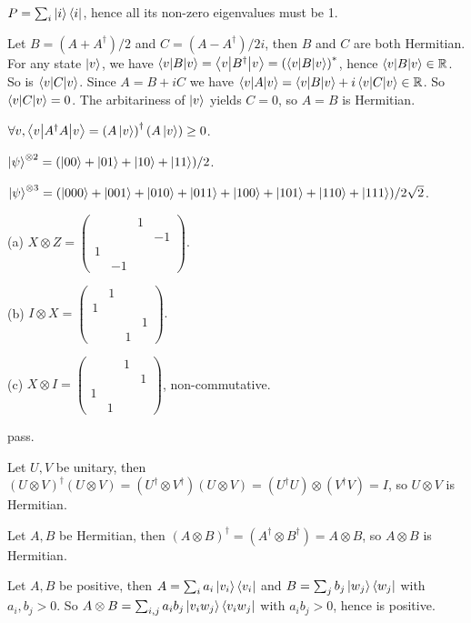 \ex $P=\sum_i\left|i\right\rangle\left\langle i\right|$, hence all its non-zero eigenvalues must be 1.

\ex Let $B=(A+A^\dagger)/2$ and $C=(A-A^\dagger)/2i$, then $B$ and $C$ are both Hermitian.
For any state $\left|v\right\rangle$, we have $\left\langle v\middle|B\middle|v\right\rangle=\left\langle v\middle|B^\dagger\middle|v\right\rangle=\left(\left\langle v\middle|B\middle|v\right\rangle\right)^*$, hence $\left\langle v\middle|B\middle|v\right\rangle\in\mathbb{R}$.
So is $\left\langle v\middle|C\middle|v\right\rangle$.
Since $A=B+iC$ we have $\left\langle v\middle|A\middle|v\right\rangle=\left\langle v\middle|B\middle|v\right\rangle+i\left\langle v\middle|C\middle|v\right\rangle\in\mathbb{R}$.
So $\left\langle v\middle|C\middle|v\right\rangle=0$.
The arbitariness of $\left|v\right\rangle$ yields $C=0$, so $A=B$ is Hermitian.

\ex $\forall v, \left\langle v\middle|A^\dagger A\middle|v\right\rangle=\left(A\left|v\right\rangle\right)^\dagger\left(A\left|v\right\rangle\right)\ge 0$.

\ex $\left|\psi\right\rangle^{\otimes 2}=(\left|00\right\rangle+\left|01\right\rangle+\left|10\right\rangle+\left|11\right\rangle)/2$.

$\left|\psi\right\rangle^{\otimes 3}=(\left|000\right\rangle+\left|001\right\rangle+\left|010\right\rangle+\left|011\right\rangle+\left|100\right\rangle+\left|101\right\rangle+\left|110\right\rangle+\left|111\right\rangle)/2\sqrt{2}$.

\ex (a) $X\otimes Z=\begin{pmatrix}&&1&\\&&&-1\\1&&&\\&-1&&\end{pmatrix}.$

(b) $I\otimes X=\begin{pmatrix}&1&&\\1&&&\\&&&1\\&&1&\end{pmatrix}.$

(c) $X\otimes I=\begin{pmatrix}&&1&\\&&&1\\1&&&\\&1&&\end{pmatrix}$, non-commutative.

\ex pass.

\ex Let $U,V$ be unitary, then $(U\otimes V)^\dagger(U\otimes V)=(U^\dagger\otimes V^\dagger)(U\otimes V)=(U^\dagger U)\otimes(V^\dagger V)=I$, so $U\otimes V$ is Hermitian.

\ex Let $A,B$ be Hermitian, then $(A\otimes B)^\dagger=(A^\dagger\otimes B^\dagger)=A\otimes B$, so $A\otimes B$ is Hermitian.

\ex Let $A,B$ be positive, then $A=\sum_ia_i\left|v_i\right\rangle\left\langle v_i\right|$ and $B=\sum_jb_j\left|w_j\right\rangle\left\langle w_j\right|$ with $a_i,b_j>0$.
So $A\otimes B=\sum_{i,j}a_ib_j\left|v_iw_j\right\rangle\left\langle v_iw_j\right|$ with $a_ib_j>0$, hence is positive.


